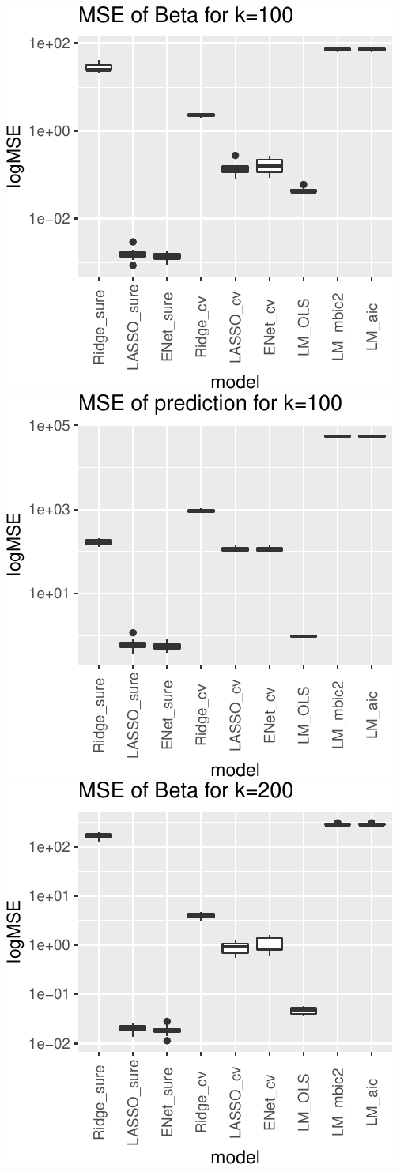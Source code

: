 \documentclass[
]{article}
\begin{document}
\includegraphics[width=0.8\linewidth]{report_files/figure-latex/unnamed-chunk-16-3}
\includegraphics[width=0.8\linewidth]{report_files/figure-latex/unnamed-chunk-16-4}
\includegraphics[width=0.8\linewidth]{report_files/figure-latex/unnamed-chunk-16-5}
\end{document}
